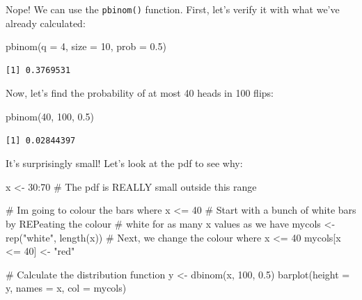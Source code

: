 \documentclass[
  letterpaper,
  DIV=11,
  numbers=noendperiod]{scrreprt}
\newenvironment{Shaded}{\begin{snugshade}}{\end{snugshade}}
\newcommand{\AttributeTok}[1]{\textcolor[rgb]{0.40,0.45,0.13}{#1}}
\newcommand{\CommentTok}[1]{\textcolor[rgb]{0.37,0.37,0.37}{#1}}
\newcommand{\DecValTok}[1]{\textcolor[rgb]{0.68,0.00,0.00}{#1}}
\newcommand{\FloatTok}[1]{\textcolor[rgb]{0.68,0.00,0.00}{#1}}
\newcommand{\FunctionTok}[1]{\textcolor[rgb]{0.28,0.35,0.67}{#1}}
\newcommand{\NormalTok}[1]{\textcolor[rgb]{0.00,0.23,0.31}{#1}}
\newcommand{\OtherTok}[1]{\textcolor[rgb]{0.00,0.23,0.31}{#1}}
\newcommand{\SpecialCharTok}[1]{\textcolor[rgb]{0.37,0.37,0.37}{#1}}
\newcommand{\StringTok}[1]{\textcolor[rgb]{0.13,0.47,0.30}{#1}}
\begin{document}
Nope! We can use the \texttt{pbinom()} function. First, let's verify it
with what we've already calculated:

\begin{Shaded}
\begin{Highlighting}[]
\FunctionTok{pbinom}\NormalTok{(}\AttributeTok{q =} \DecValTok{4}\NormalTok{, }\AttributeTok{size =} \DecValTok{10}\NormalTok{, }\AttributeTok{prob =} \FloatTok{0.5}\NormalTok{)}
\end{Highlighting}
\end{Shaded}

\begin{verbatim}
[1] 0.3769531
\end{verbatim}

Now, let's find the probability of at most 40 heads in 100 flips:

\begin{Shaded}
\begin{Highlighting}[]
\FunctionTok{pbinom}\NormalTok{(}\DecValTok{40}\NormalTok{, }\DecValTok{100}\NormalTok{, }\FloatTok{0.5}\NormalTok{)}
\end{Highlighting}
\end{Shaded}

\begin{verbatim}
[1] 0.02844397
\end{verbatim}

It's surprisingly small! Let's look at the pdf to see why:

\begin{Shaded}
\begin{Highlighting}[]
\NormalTok{x }\OtherTok{\textless{}{-}} \DecValTok{30}\SpecialCharTok{:}\DecValTok{70} \CommentTok{\# The pdf is REALLY small outside this range}

\CommentTok{\# I\textquotesingle{}m going to colour the bars where x \textless{}= 40}
\CommentTok{\# Start with a bunch of white bars by REPeating the colour}
\CommentTok{\# white for as many x values as we have}
\NormalTok{mycols }\OtherTok{\textless{}{-}} \FunctionTok{rep}\NormalTok{(}\StringTok{"white"}\NormalTok{, }\FunctionTok{length}\NormalTok{(x))}
\CommentTok{\# Next, we change the colour where x \textless{}= 40}
\NormalTok{mycols[x }\SpecialCharTok{\textless{}=} \DecValTok{40}\NormalTok{] }\OtherTok{\textless{}{-}} \StringTok{"red"}

\CommentTok{\# Calculate the distribution function}
\NormalTok{y }\OtherTok{\textless{}{-}} \FunctionTok{dbinom}\NormalTok{(x, }\DecValTok{100}\NormalTok{, }\FloatTok{0.5}\NormalTok{)}
\FunctionTok{barplot}\NormalTok{(}\AttributeTok{height =}\NormalTok{ y, }\AttributeTok{names =}\NormalTok{ x, }\AttributeTok{col =}\NormalTok{ mycols)}
\end{Highlighting}
\end{Shaded}
\end{document}
